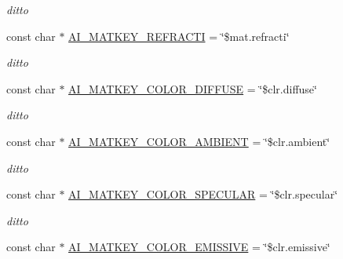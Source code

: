 \begin{DoxyCompactItemize}
\begin{DoxyCompactList}\small\item\em ditto \end{DoxyCompactList}\item 
\hypertarget{namespaceassimp_1_1material_a1ed9798a8e83bb9ad2eb4f18c19699dc}{const char $\ast$ \hyperlink{namespaceassimp_1_1material_a1ed9798a8e83bb9ad2eb4f18c19699dc}{A\+I\+\_\+\+M\+A\+T\+K\+E\+Y\+\_\+\+R\+E\+F\+R\+A\+C\+T\+I} = \char`\"{}\$mat.\+refracti\char`\"{}}\label{namespaceassimp_1_1material_a1ed9798a8e83bb9ad2eb4f18c19699dc}

\begin{DoxyCompactList}\small\item\em ditto \end{DoxyCompactList}\item 
\hypertarget{namespaceassimp_1_1material_aa6270e511e434b591346e1a1a4a71568}{const char $\ast$ \hyperlink{namespaceassimp_1_1material_aa6270e511e434b591346e1a1a4a71568}{A\+I\+\_\+\+M\+A\+T\+K\+E\+Y\+\_\+\+C\+O\+L\+O\+R\+\_\+\+D\+I\+F\+F\+U\+S\+E} = \char`\"{}\$clr.\+diffuse\char`\"{}}\label{namespaceassimp_1_1material_aa6270e511e434b591346e1a1a4a71568}

\begin{DoxyCompactList}\small\item\em ditto \end{DoxyCompactList}\item 
\hypertarget{namespaceassimp_1_1material_a842020907ae795f51f048a7a778303b9}{const char $\ast$ \hyperlink{namespaceassimp_1_1material_a842020907ae795f51f048a7a778303b9}{A\+I\+\_\+\+M\+A\+T\+K\+E\+Y\+\_\+\+C\+O\+L\+O\+R\+\_\+\+A\+M\+B\+I\+E\+N\+T} = \char`\"{}\$clr.\+ambient\char`\"{}}\label{namespaceassimp_1_1material_a842020907ae795f51f048a7a778303b9}

\begin{DoxyCompactList}\small\item\em ditto \end{DoxyCompactList}\item 
\hypertarget{namespaceassimp_1_1material_a72f5d865c77e7bec31b3de2350eebaee}{const char $\ast$ \hyperlink{namespaceassimp_1_1material_a72f5d865c77e7bec31b3de2350eebaee}{A\+I\+\_\+\+M\+A\+T\+K\+E\+Y\+\_\+\+C\+O\+L\+O\+R\+\_\+\+S\+P\+E\+C\+U\+L\+A\+R} = \char`\"{}\$clr.\+specular\char`\"{}}\label{namespaceassimp_1_1material_a72f5d865c77e7bec31b3de2350eebaee}

\begin{DoxyCompactList}\small\item\em ditto \end{DoxyCompactList}\item 
\hypertarget{namespaceassimp_1_1material_a995c134e06e6e02b3052b37b505bd2f6}{const char $\ast$ \hyperlink{namespaceassimp_1_1material_a995c134e06e6e02b3052b37b505bd2f6}{A\+I\+\_\+\+M\+A\+T\+K\+E\+Y\+\_\+\+C\+O\+L\+O\+R\+\_\+\+E\+M\+I\+S\+S\+I\+V\+E} = \char`\"{}\$clr.\+emissive\char`\"{}}\label{namespaceassimp_1_1material_a995c134e06e6e02b3052b37b505bd2f6}


\end{DoxyCompactItemize}
